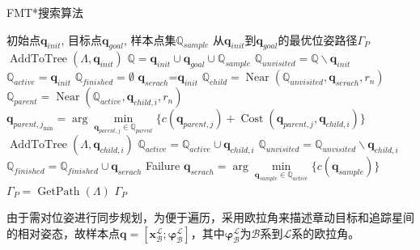 \documentclass[lang=chs, degree=master, blindreview=false, winfonts=true]{yanputhesis}
\begin{document}
\begin{algorithm}[htb]  
	\caption{FMT*搜索算法}  
	\label{FMT}  
	\begin{algorithmic}[1]  
		\Require  
		初始点$\boldsymbol{q}_{init}$,
		目标点$\boldsymbol{q}_{goal}$,
		样本点集$\mathbb{Q}_{sample}$
		\Ensure  
		从$\boldsymbol{q}_{init}$到$\boldsymbol{q}_{goal}$的最优位姿路径$\Gamma_{P}$
		\State $\operatorname{AddToTree}\left(\Lambda,\boldsymbol{q}_{init}\right)$
		\State$\mathbb{Q}=\boldsymbol{q}_{init}\cup \boldsymbol{q}_{goal}\cup \mathbb{Q}_{sample}$
		\State $\mathbb{Q}_{unvisited}=\mathbb{Q} \backslash \boldsymbol{q}_{init}$
		\State $\mathbb{Q}_{active}=\boldsymbol{q}_{init}$
		\State $\mathbb{Q}_{finished}=\emptyset$ 
		\State $\boldsymbol{q}_{serach}$=$\boldsymbol{q}_{init}$
		\State $\mathbb{Q}_{child} = \operatorname{Near}\left(\mathbb{Q}_{unvisited}, \boldsymbol{q}_{serach}, r_n\right)$
		\State $\mathbb{Q}_{parent} = \operatorname{Near}\left(\mathbb{Q}_{active}, \boldsymbol{q}_{child,i}, r_n\right)$
		\State $\boldsymbol{q}_{parent,j_{\min}}=\arg \min \limits_{\boldsymbol{q}_{parent,j} \in \mathbb{Q}_{parent}}\{c(\boldsymbol{q}_{parent,j})+\operatorname{Cost}\left(\boldsymbol{q}_{parent,j}, \boldsymbol{q}_{child,i}\right)\} \quad$
		\State $\operatorname{AddToTree}\left(\Lambda,\boldsymbol{q}_{child,i}\right)$
		\State $\mathbb{Q}_{active}=\mathbb{Q}_{active}\cup \boldsymbol{q}_{child,i}$
		\State $\mathbb{Q}_{unvisited}=\mathbb{Q}_{unvisited}\backslash \boldsymbol{q}_{child,i}$
		\EndIf
		\EndFor
		\State $\mathbb{Q}_{finished}=\mathbb{Q}_{finished}\cup \boldsymbol{q}_{serach}$
		\State \Return Failure
		\EndIf
		\State $\boldsymbol{q}_{serach}=\arg \min \limits_{\boldsymbol{q}_{sample} \in \mathbb{Q}_{active}}\{c(\boldsymbol{q}_{sample})\} \quad$
		\EndWhile
		\State $\Gamma_{P}=\operatorname{GetPath}\left(\Lambda \right)$
		\State \Return $\Gamma_{P}$
	\end{algorithmic}
\end{algorithm}

由于需对位姿进行同步规划，为便于遍历，采用欧拉角来描述章动目标和追踪星间的相对姿态，故样本点$\boldsymbol{q}=[{\boldsymbol{x}}_{\mathcal{B}}^{\mathcal{L}};\boldsymbol{\varphi}_{\mathcal{B}}^{\mathcal{L}}]$，其中$\boldsymbol{\varphi}_{\mathcal{B}}^{\mathcal{L}}$为$\mathcal{B}$系到$\mathcal{L}$系的欧拉角。
\end{document}
